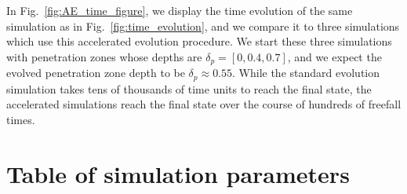 \documentclass{aastex631}
\begin{document}
In Fig.~\ref{fig:AE_time_figure}, we display the time evolution of the same simulation as in Fig.~\ref{fig:time_evolution}, and we compare it to three simulations which use this accelerated evolution procedure.
We start these three simulations with penetration zones whose depths are $\delta_p = [0, 0.4, 0.7]$, and we expect the evolved penetration zone depth to be $\delta_p \approx 0.55$.
While the standard evolution simulation takes tens of thousands of time units to reach the final state, the accelerated simulations reach the final state over the course of hundreds of freefall times.

\section{Table of simulation parameters}
\label{app:simulation_table}







\end{document}
